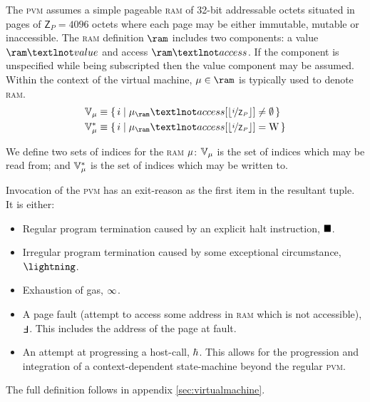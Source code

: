 The \textsc{pvm} assumes a simple pageable \textsc{ram} of 32-bit addressable octets situated in pages of $\mathsf{Z}_P = 4096$ octets where each page may be either immutable, mutable or inaccessible. The \textsc{ram} definition $\ram$ includes two components: a value $\ram¬value$ and access $\ram¬access$. If the component is unspecified while being subscripted then the value component may be assumed. Within the context of the virtual machine, $\memory \in \ram$ is typically used to denote \textsc{ram}.
\begin{align}
  \readable{\memory} &\equiv \set{\build{i}{\memory_\ram¬access\subb{\floor{\nicefrac{i}{\mathsf{Z}_P}}} \ne \none}} \\
  \writable{\memory} &\equiv \set{\build{i}{\memory_\ram¬access\subb{\floor{\nicefrac{i}{\mathsf{Z}_P}}} = \text{W} }}
\end{align}

We define two sets of indices for the \textsc{ram} $\mu$: $\mathbb{V}_{\mu}$ is the set of indices which may be read from; and $\mathbb{V}_{\mu}^*$ is the set of indices which may be written to.

Invocation of the \textsc{pvm} has an exit-reason as the first item in the resultant tuple. It is either:
\begin{itemize}
  \item Regular program termination caused by an explicit halt instruction, $\blacksquare$.
  \item Irregular program termination caused by some exceptional circumstance, $\panic$.
  \item Exhaustion of gas, $\infty$.
  \item A page fault (attempt to access some address in \textsc{ram} which is not accessible), $\fault$. This includes the address of the page at fault.
  \item An attempt at progressing a host-call, $\hbar$. This allows for the progression and integration of a context-dependent state-machine beyond the regular \textsc{pvm}.
\end{itemize}

The full definition follows in appendix \ref{sec:virtualmachine}.

















